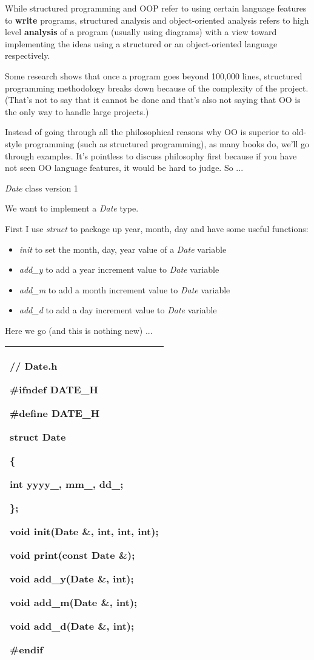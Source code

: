 \documentclass[
]{article}
\providecommand{\tightlist}{%
  \setlength{\itemsep}{0pt}\setlength{\parskip}{0pt}}
\begin{document}
While structured programming and OOP refer to using certain language
features to \textbf{write} programs, structured analysis and
object-oriented analysis refers to high level \textbf{analysis} of a
program (usually using diagrams) with a view toward implementing the
ideas using a structured or an object-oriented language respectively.

Some research shows that once a program goes beyond 100,000 lines,
structured programming methodology breaks down because of the complexity
of the project. (That's not to say that it cannot be done and that's
also not saying that OO is the only way to handle large projects.)

Instead of going through all the philosophical reasons why OO is
superior to old-style programming (such as structured programming), as
many books do, we'll go through examples. It's pointless to discuss
philosophy first because if you have not seen OO language features, it
would be hard to judge. So ...

\emph{Date} class version 1

We want to implement a \emph{Date} type.

First I use \emph{struct} to package up year, month, day and have some
useful functions:

\begin{itemize}
\tightlist
\item
  \emph{init} to set the month, day, year value of a \emph{Date}
  variable
\item
  \emph{add\_y} to add a year increment value to \emph{Date} variable
\item
  \emph{add\_m} to add a month increment value to \emph{Date} variable
\item
  \emph{add\_d} to add a day increment value to \emph{Date} variable
\end{itemize}

Here we go (and this is nothing new) ...

\begin{longtable}[]{@{}l@{}}
\toprule
\endhead
\begin{minipage}[t]{0.97\columnwidth}\raggedright
// Date.h

\#ifndef DATE\_H

\#define DATE\_H

struct Date

\{

int yyyy\_, mm\_, dd\_;

\};

void init(Date \&, int, int, int);

void print(const Date \&);

void add\_y(Date \&, int);

void add\_m(Date \&, int);

void add\_d(Date \&, int);

\#endif\strut
\end{minipage}\tabularnewline
\bottomrule
\end{longtable}
\end{document}
